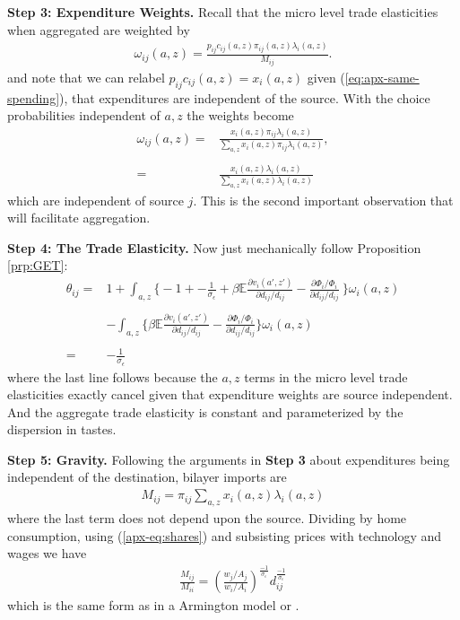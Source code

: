 \documentclass[12pt,pdftex]{article}
\begin{document}
\begin{onehalfspacing}
\textbf{Step 3: Expenditure Weights.} Recall that the micro level trade elasticities when aggregated are weighted by
\begin{align}
\omega_{ij}(a,z) = \frac{p_{ij}c_{ij}(a,z)\pi_{ij}(a,z) \lambda_{i}(a,z)}{M_{ij}}.
\end{align}
and note that we can relabel $p_{ij}c_{ij}(a,z) = x_{i}(a,z)$ given (\ref{eq:apx-same-spending}), that expenditures are independent of the source. With the choice probabilities independent of $a,z$ the weights become
\begin{align}
\omega_{ij}(a,z) =& \frac{x_{i}(a,z)\pi_{ij} \lambda_{i}(a,z)}{\sum_{a,z}x_{i}(a,z)\pi_{ij} \lambda_{i}(a,z)}, \\
\nonumber \\
=& \frac{x_{i}(a,z) \lambda_{i}(a,z)}{\sum_{a,z} x_{i}(a,z) \lambda_{i}(a,z)}
\end{align}
which are independent of source $j$. This is the second important observation that will facilitate aggregation.

\textbf{Step 4: The Trade Elasticity.} Now just mechanically follow Proposition \ref{prp:GET}:
\begin{align}
\nonumber
\theta_{ij} =& 1 + \int_{a,z} \bigg \{ -1 +  -\frac{1}{\sigma_{\epsilon}} + \beta \mathbb{E} \frac{\partial v_{i}(a',z')}{\partial d_{ij}/d_{ij}} -  \frac{\partial \Phi_{i} / \Phi_{i}}{\partial d_{ij}/d_{ij}} \  \bigg \}\omega_{i}(a,z) \\
\nonumber \\
& - \int_{a,z} \bigg \{   \beta \mathbb{E} \frac{\partial v_{i}(a',z')}{\partial d_{ij}/d_{ij}} -  \frac{\partial \Phi_{i} / \Phi_{i}}{\partial d_{ij}/d_{ij}}  \bigg \}\omega_{i}(a,z) \\
\nonumber \\
= & -\frac{1}{\sigma_{\epsilon}} \nonumber
\end{align}
where the last line follows because the $a,z$ terms in the micro level trade elasticities exactly cancel given that expenditure weights are source independent. And the aggregate trade elasticity is constant and parameterized by the dispersion in tastes.

\textbf{Step 5: Gravity.} Following the arguments in \textbf{Step 3} about expenditures being independent of the destination, bilayer imports are
\begin{align}
M_{ij} = \pi_{ij} \sum_{a,z}x_{i}(a,z) \lambda_{i}(a,z)
\end{align}
where the last term does not depend upon the source. Dividing by home consumption, using (\ref{apx-eq:shares}) and subsisting prices with technology and wages we have
\begin{align}
\frac{M_{ij}}{M_{ii}} = \left( \frac{  w_{j} / A_{j} }{  w_{i} / A_{i} } \right)^{\frac{-1}{\sigma_{\epsilon}}} d_{ij}^{\frac{-1}{\sigma_{\epsilon}}}
\end{align}
which is the same form as in a Armington model or \citet{eaton2002technology}.


\end{onehalfspacing}
\end{document}
